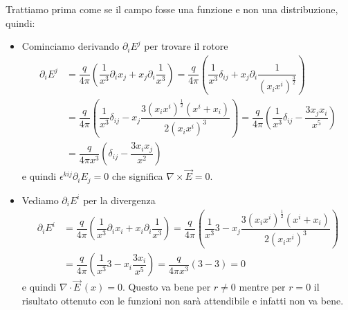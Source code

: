 \documentclass[12pt,a4paper,titlepage, twoside, openright]{book}
\numberwithin{equation}{chapter}
\begin{document}
Trattiamo prima come se il campo fosse una funzione e non una distribuzione, quindi:
\begin{itemize}
\item Cominciamo derivando $\partial_iE^j$ per trovare il rotore
\begin{align*}
\partial_i E^j&=\dfrac{q}{4\pi}\left(\dfrac{1}{x^3}\partial_ix_j +x_j\partial_i\dfrac{1}{x^3}   \right)
 = \dfrac{q}{4\pi}\left(\dfrac{1}{x^3}\delta_{ij} +x_j\partial_i\dfrac{1}{(x_ix^i)^\frac{3}{2}}   \right) \\
& = \dfrac{q}{4\pi}\left(\dfrac{1}{x^3}\delta_{ij} -x_j\dfrac{3(x_ix^i)^\frac{1}{2}(x^i+x_i)}{2(x_ix^i)^3}  \right) 
 = \dfrac{q}{4\pi}\left(\dfrac{1}{x^3}\delta_{ij} -\dfrac{3x_jx_i}{x^5} \right) \\
& = \dfrac{q}{4\pi x^3}\left(\delta_{ij} -\dfrac{3x_ix_j}{x^2} \right)
\end{align*}
e quindi $\epsilon^{kij}\partial_i E_j=0$ che significa $\nabla\times\vec{E}=0$.
\item Vediamo $\partial_iE^i$ per la divergenza
\begin{align*}
\partial_i E^i & = \dfrac{q}{4\pi}\left(\dfrac{1}{x^3}\partial_ix_i +x_i\partial_i\dfrac{1}{x^3}   \right) = 
 \dfrac{q}{4\pi}\left(\dfrac{1}{x^3}3 -x_j\dfrac{3(x_ix^i)^\frac{1}{2}(x^i+x_i)}{2(x_ix^i)^3}  \right) \\
& = \dfrac{q}{4\pi}\left(\dfrac{1}{x^3}3 -x_i\dfrac{3x_i}{x^5}  \right) = 
\dfrac{q}{4\pi x^3}\left(3 -3 \right)=0
\end{align*}
e quindi $\nabla\cdot\vec{E}\,(x)=0$. Questo va bene per $r\neq 0$ mentre per $r=0$ il risultato ottenuto con le funzioni non sarà attendibile e infatti non va bene.
\end{itemize}
\end{document}
